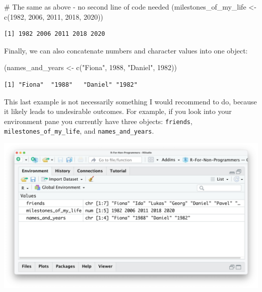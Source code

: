 \documentclass[
  letterpaper,
]{krantz}
\makeatletter
\newenvironment{Shaded}{\begin{snugshade}}{\end{snugshade}}
\newcommand{\CommentTok}[1]{\textcolor[rgb]{0.37,0.37,0.37}{#1}}
\newcommand{\DecValTok}[1]{\textcolor[rgb]{0.68,0.00,0.00}{#1}}
\newcommand{\FunctionTok}[1]{\textcolor[rgb]{0.28,0.35,0.67}{#1}}
\newcommand{\NormalTok}[1]{\textcolor[rgb]{0.00,0.23,0.31}{#1}}
\newcommand{\OtherTok}[1]{\textcolor[rgb]{0.00,0.23,0.31}{#1}}
\newcommand{\StringTok}[1]{\textcolor[rgb]{0.13,0.47,0.30}{#1}}
\newenvironment{kframe}{%
\medskip{}
\setlength{\fboxsep}{.8em}
 \def\at@end@of@kframe{}%
 \ifinner\ifhmode%
  \def\at@end@of@kframe{\end{minipage}}%
  \begin{minipage}{\columnwidth}%
 \fi\fi%
 \def\FrameCommand##1{\hskip\@totalleftmargin \hskip-\fboxsep
 \colorbox{shadecolor}{##1}\hskip-\fboxsep
     \hskip-\linewidth \hskip-\@totalleftmargin \hskip\columnwidth}%
 \MakeFramed {\advance\hsize-\width
   \@totalleftmargin\z@ \linewidth\hsize
   \@setminipage}}%
 {\par\unskip\endMakeFramed%
 \at@end@of@kframe}
\renewenvironment{Shaded}{\begin{kframe}}{\end{kframe}}
\makeatother
\begin{document}
\begin{Shaded}
\begin{Highlighting}[]
\CommentTok{\# The same as above {-} no second line of code needed}
\NormalTok{(milestones\_of\_my\_life }\OtherTok{\textless{}{-}} \FunctionTok{c}\NormalTok{(}\DecValTok{1982}\NormalTok{, }\DecValTok{2006}\NormalTok{, }\DecValTok{2011}\NormalTok{, }\DecValTok{2018}\NormalTok{, }\DecValTok{2020}\NormalTok{))}
\end{Highlighting}
\end{Shaded}

\begin{verbatim}
[1] 1982 2006 2011 2018 2020
\end{verbatim}

Finally, we can also concatenate numbers and character values into one
object:

\begin{Shaded}
\begin{Highlighting}[]
\NormalTok{(names\_and\_years }\OtherTok{\textless{}{-}} \FunctionTok{c}\NormalTok{(}\StringTok{"Fiona"}\NormalTok{, }\DecValTok{1988}\NormalTok{, }\StringTok{"Daniel"}\NormalTok{, }\DecValTok{1982}\NormalTok{))}
\end{Highlighting}
\end{Shaded}

\begin{verbatim}
[1] "Fiona"  "1988"   "Daniel" "1982"  
\end{verbatim}

This last example is not necessarily something I would recommend to do,
because it likely leads to undesirable outcomes. For example, if you
look into your environment pane you currently have three objects:
\texttt{friends}, \texttt{milestones\_of\_my\_life}, and
\texttt{names\_and\_years}.

\includegraphics{images/chapter_05_img/01_basic_computation_environment_objects.png}
\end{document}
